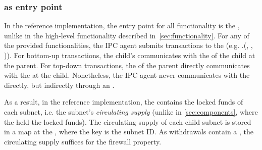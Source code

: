 \subsubsection{\gw as entry point}
\label{sec:gwrefimpl}

In the reference implementation, the entry point for all functionality is the \gw, unlike in the high-level functionality described in~\cref{sec:functionality}. For any of the provided functionalities, the IPC agent submits transactions to the \gw (e.g. \gw.(, , )). For bottom-up transactions, the child's \gw communicates with the \sa of the child at the parent. For top-down transactions, the \gw of the parent directly communicates with the \gw at the child. Nonetheless, the IPC agent never communicates with the \sa directly, but indirectly through an \gw.


     As a result, in the reference implementation, the \gw contains the locked funds of each subnet, i.e. the subnet's \textit{circulating supply} (unlike in \cref{sec:components}, where the \sa held the locked funds). The circulating supply of each child subnet is stored in a map at the \gw, where the key is the subnet ID. As withdrawals contain a \pof, the circulating supply suffices for the firewall property.


